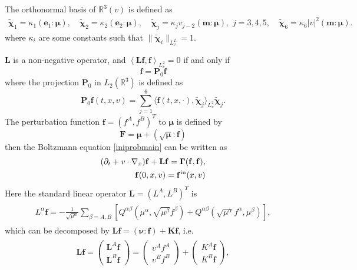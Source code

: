 \documentclass[reqno]{amsart}
\numberwithin{equation}{section}
\numberwithin{equation}{section}
\begin{document}
The ‌orthonormal basis of $\mathbb{R}^3(v)$ is defined
as
\begin{gather}
	\tilde{\bm{\chi}}_1=\kappa_1(\mathbf{e}_1:\bm{\mu}), \quad \tilde{\bm{\chi}}_2=\kappa_2(\mathbf{e}_2:\bm{\mu}), \quad\tilde{\bm{\chi}}_j=\kappa_jv_{j-2}( \mathbf{m}:\bm{\mu}),\,\, j=3,4,5,  \quad  \tilde{\bm{\chi}}_6=\kappa_6|v|^2(\mathbf{m}:\bm{\mu}).\label{deforthonormalB}
\end{gather}
where $\kappa_i$ are some constants such that $\|\tilde{\bm{\chi}}_i\|_{L_v^2}=1$.

 $\mathbf{L}$ is a non-negative operator, and $\left\langle \mathbf{L}\mathbf{f}, \mathbf{f}  \right\rangle_{L_v^2}=0$ if and only if 
\begin{equation}
	\mathbf{f}= \mathbf{P}_0 \mathbf{f}
\end{equation}
where the projection $\mathbf{P}_0$ in $L_2(\mathbb{R}^3)$ is defined as
\begin{equation*}
	\mathbf{P}_0 \mathbf{f}(t,x,v) = \sum^6_{j=1}\big\langle \mathbf{f}(t,x,\cdot), \tilde{\bm{\chi}}_j \big\rangle_{L_v^2}\tilde{\bm{\chi}}_j.
\end{equation*}
The perturbation function $\mathbf{f}=(f^A,f^B)^T$ to $\bm{\mu}$ is defined by
\begin{equation}
	\mathbf{F}=\bm{\mu}+(\sqrt{\bm{\mu}}:\mathbf{f})
\end{equation}
 then the Boltzmann equation \eqref{iniprobmain} can be written as 
\begin{align}\label{socal555EQSO}
	\begin{split}
	(\partial_t + v \cdot \nabla_{x}) \mathbf{f} +\mathbf{L}\mathbf{f} = \bf{\Gamma}(f,f),\\
	\mathbf{f}(0,x,v) = \mathbf{f}^{\rm{in}}(x,v)
	\end{split}
\end{align}
Here the standard linear operator $\mathbf{L}=(L^A,L^B)^T$ is
	\begin{gather}\label{4.2}
	\begin{split}
		L^\alpha \mathbf{f}=- \frac{1}{\sqrt{\mu^{\alpha}}} \sum_{\beta=A,B} \left[Q^{ \alpha\beta}(\mu^\alpha,\sqrt{\mu^{\beta}} f^{\beta})+Q^{\alpha \beta}(\sqrt{\mu^\alpha}f^{\alpha},\mu^\beta)\right],
	\end{split}
\end{gather}
which can be decomposed by $\mathbf{L}\mathbf{f}=(\bm{\nu}:\mathbf{f})+\mathbf{K}\mathbf{f}$, i.e. 
\begin{gather}\label{Ldeopvec}
	\begin{split}
		\mathbf{L}\mathbf{f}=\left(\begin{array} {lll} \mathbf{L}^{A} \mathbf{f} \\  \mathbf{L}^{B} \mathbf{f} \end{array}\right) = \left(\begin{array} {lll} \upsilon^{A} f^A \\ \upsilon^{B} f^B \end{array}\right)+\left(\begin{array} {lll}  K^A \mathbf{f}\\   K^B \mathbf{f}\end{array}\right),
	\end{split}	
\end{gather}
\end{document}
